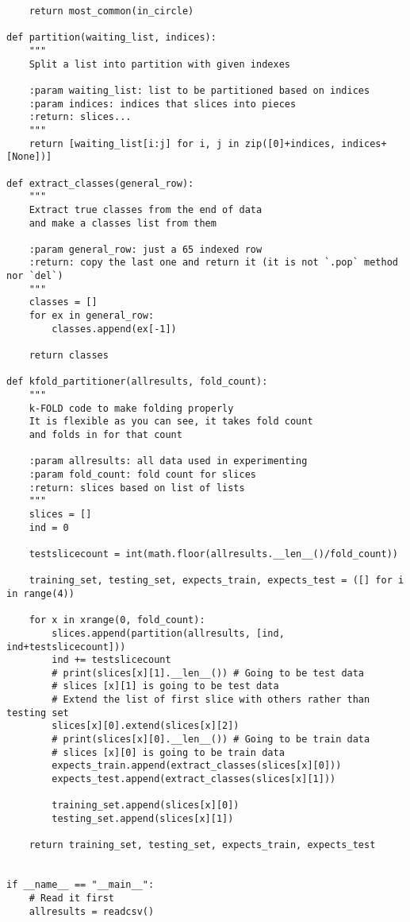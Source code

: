 \documentclass[11pt]{article}
\begin{document}
\begin{enumerate}[\indent a)]
\begin{verbatim}
    return most_common(in_circle)

def partition(waiting_list, indices):
    """
    Split a list into partition with given indexes

    :param waiting_list: list to be partitioned based on indices
    :param indices: indices that slices into pieces
    :return: slices...
    """
    return [waiting_list[i:j] for i, j in zip([0]+indices, indices+[None])]

def extract_classes(general_row):
    """
    Extract true classes from the end of data
    and make a classes list from them

    :param general_row: just a 65 indexed row
    :return: copy the last one and return it (it is not `.pop` method nor `del`)
    """
    classes = []
    for ex in general_row:
        classes.append(ex[-1])

    return classes

def kfold_partitioner(allresults, fold_count):
    """
    k-FOLD code to make folding properly
    It is flexible as you can see, it takes fold count
    and folds in for that count

    :param allresults: all data used in experimenting
    :param fold_count: fold count for slices
    :return: slices based on list of lists
    """
    slices = []
    ind = 0

    testslicecount = int(math.floor(allresults.__len__()/fold_count))

    training_set, testing_set, expects_train, expects_test = ([] for i in range(4))

    for x in xrange(0, fold_count):
        slices.append(partition(allresults, [ind, ind+testslicecount]))
        ind += testslicecount
        # print(slices[x][1].__len__()) # Going to be test data
        # slices [x][1] is going to be test data
        # Extend the list of first slice with others rather than testing set
        slices[x][0].extend(slices[x][2])
        # print(slices[x][0].__len__()) # Going to be train data
        # slices [x][0] is going to be train data
        expects_train.append(extract_classes(slices[x][0]))
        expects_test.append(extract_classes(slices[x][1]))

        training_set.append(slices[x][0])
        testing_set.append(slices[x][1])

    return training_set, testing_set, expects_train, expects_test


if __name__ == "__main__":
    # Read it first
    allresults = readcsv()


\end{verbatim}
\end{enumerate}
\end{document}
